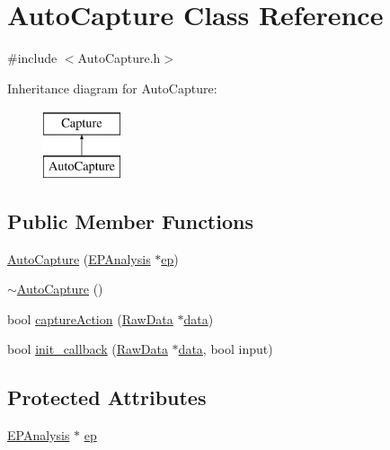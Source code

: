 \hypertarget{class_auto_capture}{\section{Auto\+Capture Class Reference}
\label{class_auto_capture}
}


{\ttfamily \#include $<$Auto\+Capture.\+h$>$}

Inheritance diagram for Auto\+Capture\+:\begin{figure}[H]
\begin{center}
\leavevmode
\includegraphics[height=2.000000cm]{class_auto_capture}
\end{center}
\end{figure}
\subsection*{Public Member Functions}
\begin{DoxyCompactItemize}
\item 
\hyperlink{class_auto_capture_acaabce59abc33a0b488fb84c196c1a9e}{Auto\+Capture} (\hyperlink{class_e_p_analysis}{E\+P\+Analysis} $\ast$\hyperlink{class_auto_capture_a7527bcbfe6636e4e34b3b0724d22ab5c}{ep})
\item 
\hyperlink{class_auto_capture_abe4754e9dd597d38f8d15fbdd8a39339}{$\sim$\+Auto\+Capture} ()
\item 
bool \hyperlink{class_auto_capture_ab5dc241ceb0226dcb2a17a3b56646210}{capture\+Action} (\hyperlink{class_raw_data}{Raw\+Data} $\ast$\hyperlink{readwave_8h_aa12fa7025612e5f4774f2412dd7f465b}{data})
\item 
bool \hyperlink{class_auto_capture_a39edd9a81495af7491701ef7b491a2bc}{init\+\_\+callback} (\hyperlink{class_raw_data}{Raw\+Data} $\ast$\hyperlink{readwave_8h_aa12fa7025612e5f4774f2412dd7f465b}{data}, bool input)
\end{DoxyCompactItemize}
\subsection*{Protected Attributes}
\begin{DoxyCompactItemize}
\item 
\hyperlink{class_e_p_analysis}{E\+P\+Analysis} $\ast$ \hyperlink{class_auto_capture_a7527bcbfe6636e4e34b3b0724d22ab5c}{ep}
\end{DoxyCompactItemize}

